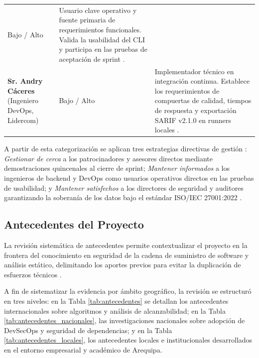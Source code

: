 \begin{table}[H]
\begin{tabularx}{\textwidth}{>{\raggedright\arraybackslash}p{4.2cm} >{\centering\arraybackslash}p{2.6cm} >{\raggedright\arraybackslash}X}
Bajo / Alto & 
Usuario clave operativo y fuente primaria de requerimientos funcionales. Valida la usabilidad del CLI y participa en las pruebas de aceptación de sprint \parencite{kendall2019systems}. \\ %
\addlinespace
\textbf{Sr. Andry Cáceres} \newline (Ingeniero DevOps, Lidercom) & 
Bajo / Alto & 
Implementador técnico en integración continua. Establece los requerimientos de compuertas de calidad, tiempos de respuesta y exportación SARIF v2.1.0 en runners locales \parencite{humble2010continuous, oasis2019sarif}. \\ %
\bottomrule
\end{tabularx}
\end{table}

A partir de esta categorización se aplican tres estrategias directivas de gestión \parencite{pmi2021pmbok}: %
\textit{Gestionar de cerca} a los patrocinadores y asesores directos mediante demostraciones quincenales al cierre de sprint; \textit{Mantener informados} a los ingenieros de backend y DevOps como usuarios operativos directos en las pruebas de usabilidad; y \textit{Mantener satisfechos} a los directores de seguridad y auditores garantizando la soberanía de los datos bajo el estándar ISO/IEC 27001:2022 \parencite{ladisa2023sok, gutierrez2024auditoria}. %

\subsection{Antecedentes del Proyecto}
La revisión sistemática de antecedentes permite contextualizar el proyecto en la frontera del conocimiento en seguridad de la cadena de suministro de software y análisis estático, delimitando los aportes previos para evitar la duplicación de esfuerzos técnicos \parencite{hernandez2014metodologia, torres2026proyecto}. %

A fin de sistematizar la evidencia por ámbito geográfico, la revisión se estructuró en tres niveles: en la Tabla \ref{tab:antecedentes} se detallan los antecedentes internacionales sobre algoritmos y análisis de alcanzabilidad; en la Tabla \ref{tab:antecedentes_nacionales}, las investigaciones nacionales sobre adopción de DevSecOps y seguridad de dependencias; y en la Tabla \ref{tab:antecedentes_locales}, los antecedentes locales e institucionales desarrollados en el entorno empresarial y académico de Arequipa.

